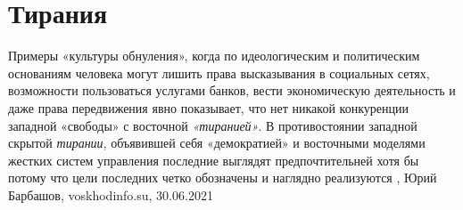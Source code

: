  
 
 
 
 
\chapter{Тирания}


Примеры «культуры обнуления», когда по идеологическим и политическим основаниям
человека могут лишить права высказывания в социальных сетях, возможности
пользоваться услугами банков, вести экономическую деятельность и даже права
передвижения явно показывает, что нет никакой конкуренции западной «свободы» с
восточной \emph{«тиранией»}.  В противостоянии западной скрытой \emph{тирании}, объявившей
себя «демократией» и восточными моделями жестких систем управления последние
выглядят предпочтительней хотя бы потому что цели последних четко обозначены и
наглядно реализуются
, 
Юрий Барбашов, voskhodinfo.su, 30.06.2021

